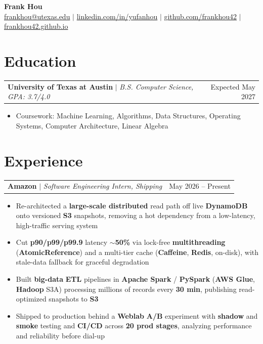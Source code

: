 \documentclass[letterpaper,10pt]{article}
\makeatletter
\newcommand{\resumeWorkHeading}[2]{%
  \vspace{2pt}\noindent
  \begin{tabular*}{\textwidth}{@{}l@{\extracolsep{\fill}}r@{}}
    #1 & #2 \\
  \end{tabular*}%
  \vspace{-2pt}
}
\newcommand{\resumeItemListStart}{\begin{itemize}}
\newcommand{\resumeItemListEnd}{\end{itemize}\vspace{3pt}}
\newcommand{\resumeItem}[1]{\item #1}
\makeatother
\begin{document}
\begin{center}
  {\huge \textbf{Frank Hou}} \\[2pt]
  \small
  \href{mailto:frankhou@utexas.edu}{frankhou@utexas.edu} $|$
  \href{https://linkedin.com/in/yufanhou}{linkedin.com/in/yufanhou} $|$
  \href{https://github.com/frankhou42}{github.com/frankhou42} $|$
  \href{https://frankhou42.github.io/}{frankhou42.github.io}
\end{center}
\vspace{-4pt}

\section{Education}
\resumeWorkHeading
{\textbf{University of Texas at Austin} $|$ \emph{B.S. Computer Science, GPA: 3.7/4.0}}{Expected May 2027}
\resumeItemListStart
\resumeItem{Coursework: Machine Learning, Algorithms, Data Structures, Operating Systems, Computer Architecture, Linear Algebra}
\resumeItemListEnd

\section{Experience}
\resumeWorkHeading
{\textbf{Amazon} $|$ \emph{Software Engineering Intern, Shipping}}{May 2026 -- Present}
\resumeItemListStart
\resumeItem{Re-architected a \textbf{large-scale distributed} read path off live \textbf{DynamoDB} onto versioned \textbf{S3} snapshots, removing a hot dependency from a low-latency, high-traffic serving system}
\resumeItem{Cut \textbf{p90/p99/p99.9} latency \textbf{$\sim$50\%} via lock-free \textbf{multithreading} (\textbf{AtomicReference}) and a multi-tier cache (\textbf{Caffeine}, \textbf{Redis}, on-disk), with stale-data fallback for graceful degradation}
\resumeItem{Built \textbf{big-data} \textbf{ETL} pipelines in \textbf{Apache Spark} / \textbf{PySpark} (\textbf{AWS Glue}, \textbf{Hadoop} S3A) processing millions of records every \textbf{30 min}, publishing read-optimized snapshots to \textbf{S3}}
\resumeItem{Shipped to production behind a \textbf{Weblab} \textbf{A/B} experiment with \textbf{shadow} and \textbf{smoke} testing and \textbf{CI/CD} across \textbf{20 prod stages}, analyzing performance and reliability before dial-up}
\resumeItemListEnd
\end{document}
